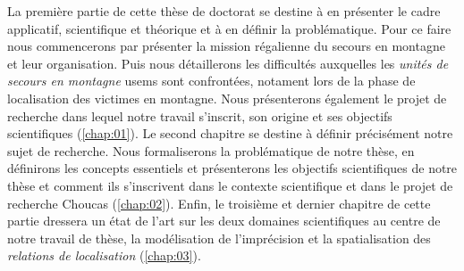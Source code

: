 La première partie de cette thèse de doctorat se destine à en
présenter le cadre applicatif, scientifique et théorique et à en
définir la problématique. Pour ce faire nous commencerons par
présenter la mission régalienne du secours en montagne et leur
organisation. Puis nous détaillerons les difficultés auxquelles les
\emph{unités de secours en montagne} \acp{usem} sont confrontées,
notament lors de la phase de localisation des victimes en
montagne. Nous présenterons également le projet de recherche dans
lequel notre travail s'inscrit, son origine et ses objectifs
scientifiques (\autoref{chap:01}). Le second chapitre se destine à
définir précisément notre sujet de recherche. Nous formaliserons la
problématique de notre thèse, en définirons les concepts essentiels et
présenterons les objectifs scientifiques de notre thèse et comment ils
s'inscrivent dans le contexte scientifique et dans le projet de
recherche Choucas (\autoref{chap:02}).  Enfin, le troisième et dernier
chapitre de cette partie dressera un état de l'art sur les deux
domaines scientifiques au centre de notre travail de thèse, la
modélisation de l'imprécision et la spatialisation des \emph{relations
  de localisation} (\autoref{chap:03}).

